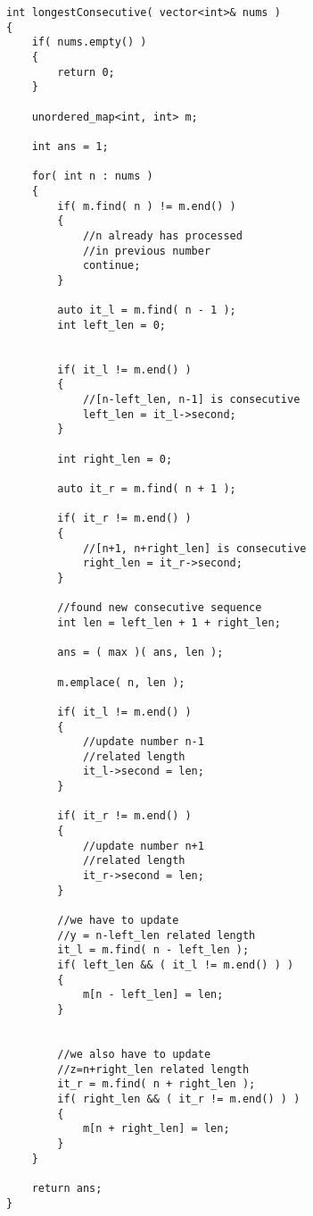 \setcounter{lstlisting}{0}
\begin{lstlisting}[style=customc, caption={Hash Map}]
int longestConsecutive( vector<int>& nums )
{
    if( nums.empty() )
    {
        return 0;
    }

    unordered_map<int, int> m;

    int ans = 1;

    for( int n : nums )
    {
        if( m.find( n ) != m.end() )
        {
            //n already has processed
            //in previous number
            continue;
        }

        auto it_l = m.find( n - 1 );
        int left_len = 0;


        if( it_l != m.end() )
        {
            //[n-left_len, n-1] is consecutive
            left_len = it_l->second;
        }

        int right_len = 0;

        auto it_r = m.find( n + 1 );

        if( it_r != m.end() )
        {
            //[n+1, n+right_len] is consecutive
            right_len = it_r->second;
        }

        //found new consecutive sequence
        int len = left_len + 1 + right_len;

        ans = ( max )( ans, len );

        m.emplace( n, len );

        if( it_l != m.end() )
        {
            //update number n-1
            //related length
            it_l->second = len;
        }

        if( it_r != m.end() )
        {
            //update number n+1
            //related length
            it_r->second = len;
        }

        //we have to update
        //y = n-left_len related length
        it_l = m.find( n - left_len );
        if( left_len && ( it_l != m.end() ) )
        {
            m[n - left_len] = len;
        }


        //we also have to update
        //z=n+right_len related length
        it_r = m.find( n + right_len );
        if( right_len && ( it_r != m.end() ) )
        {
            m[n + right_len] = len;
        }
    }

    return ans;
}
\end{lstlisting}
